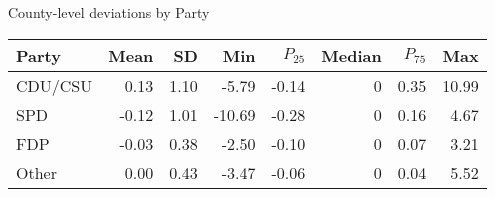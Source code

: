 

\caption{County-level deviations by Party}
\centering
\begin{tabular}[t]{lrrrrrrr}
\toprule
Party & Mean & SD & Min & $P_{25}$ & Median & $P_{75}$ & Max\\
\midrule
CDU/CSU & 0.13 & 1.10 & -5.79 & -0.14 & 0 & 0.35 & 10.99\\
SPD & -0.12 & 1.01 & -10.69 & -0.28 & 0 & 0.16 & 4.67\\
FDP & -0.03 & 0.38 & -2.50 & -0.10 & 0 & 0.07 & 3.21\\
Other & 0.00 & 0.43 & -3.47 & -0.06 & 0 & 0.04 & 5.52\\
\bottomrule
\end{tabular}
